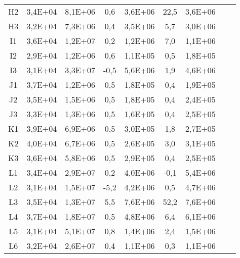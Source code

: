 \begin{center}
\begin{longtable}{ccccccccc}
    H2    & 3,4E+04 & 8,1E+06 & 0,6   & 3,6E+06 & 22,5  & 3,6E+06 \\
    H3    & 3,2E+04 & 7,3E+06 & 0,4   & 3,5E+06 & 5,7   & 3,0E+06 \\
    I1    & 3,6E+04 & 1,2E+07 & 0,2   & 1,2E+06 & 7,0   & 1,1E+06 \\
    I2    & 2,9E+04 & 1,2E+06 & 0,6   & 1,1E+05 & 0,5   & 1,8E+05 \\
    I3    & 3,1E+04 & 3,3E+07 & -0,5  & 5,6E+06 & 1,9   & 4,6E+06 \\
    J1    & 3,7E+04 & 1,2E+06 & 0,5   & 1,8E+05 & 0,4   & 1,9E+05 \\
    J2    & 3,5E+04 & 1,5E+06 & 0,5   & 1,8E+05 & 0,4   & 2,4E+05 \\
    J3    & 3,3E+04 & 1,3E+06 & 0,5   & 1,6E+05 & 0,4   & 2,5E+05 \\
    K1    & 3,9E+04 & 6,9E+06 & 0,5   & 3,0E+05 & 1,8   & 2,7E+05 \\
    K2    & 4,0E+04 & 6,7E+06 & 0,5   & 2,6E+05 & 3,0   & 3,1E+05 \\
    K3    & 3,6E+04 & 5,8E+06 & 0,5   & 2,9E+05 & 0,4   & 2,5E+05 \\
    L1    & 3,4E+04 & 2,9E+07 & 0,2   & 4,0E+06 & -0,1  & 5,4E+06 \\
    L2    & 3,1E+04 & 1,5E+07 & -5,2  & 4,2E+06 & 0,5   & 4,7E+06 \\
    L3    & 3,5E+04 & 1,3E+07 & 5,5   & 7,6E+06 & 52,2  & 7,6E+06 \\
    L4    & 3,7E+04 & 1,8E+07 & 0,5   & 4,8E+06 & 6,4   & 6,1E+06 \\
    L5    & 3,1E+04 & 5,1E+07 & 0,8   & 1,4E+06 & 2,4   & 1,5E+06 \\
    L6    & 3,2E+04 & 2,6E+07 & 0,4   & 1,1E+06 & 0,3   & 1,1E+06 \\
\end{longtable}
\end{center}

